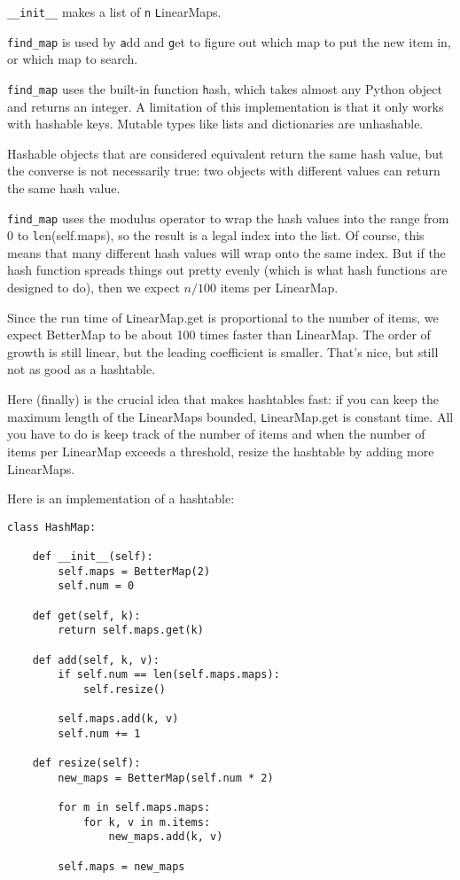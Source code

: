 \documentclass[
DIV=11,
fontsize=12,
twoside,
headinclude=false,
titlepage=firstiscover,
abstract=true,
headsepline=true,
footsepline=true,
chapterprefix=true, %
headings=big,
bibliography=totoc,%
captions=tableheading
]{scrbook}
\theoremstyle{definition}
\begin{document}
\verb"__init__" makes a list of {\texttt n} {\texttt LinearMap}s.

\verb"find_map" is used by
{\texttt add} and {\texttt get}
to figure out which map to put the
new item in, or which map to search.

\verb"find_map" uses the built-in function {\texttt hash}, which takes
almost any Python object and returns an integer.  A limitation of this
implementation is that it only works with hashable keys.  Mutable
types like lists and dictionaries are unhashable.

Hashable objects that are considered equivalent return the same hash
value, but the converse is not necessarily true: two objects with
different values can return the same hash value.

\verb"find_map" uses the modulus operator to wrap the hash values
into the range from 0 to {\texttt len(self.maps)}, so the result is a legal
index into the list.  Of course, this means that many different
hash values will wrap onto the same index.  But if the hash function
spreads things out pretty evenly (which is what hash functions
are designed to do), then we expect $n/100$ items per LinearMap.

Since the run time of {\texttt LinearMap.get} is proportional to the
number of items, we expect BetterMap to be about 100 times faster
than LinearMap.  The order of growth is still linear, but the
leading coefficient is smaller.  That's nice, but still not
as good as a hashtable.

Here (finally) is the crucial idea that makes hashtables fast: if you
can keep the maximum length of the LinearMaps bounded, {\texttt
  LinearMap.get} is constant time.  All you have to do is keep track
of the number of items and when the number of
items per LinearMap exceeds a threshold, resize the hashtable by
adding more LinearMaps.

Here is an implementation of a hashtable:

\begin{lstlisting}
class HashMap:

    def __init__(self):
        self.maps = BetterMap(2)
        self.num = 0

    def get(self, k):
        return self.maps.get(k)

    def add(self, k, v):
        if self.num == len(self.maps.maps):
            self.resize()

        self.maps.add(k, v)
        self.num += 1

    def resize(self):
        new_maps = BetterMap(self.num * 2)

        for m in self.maps.maps:
            for k, v in m.items:
                new_maps.add(k, v)

        self.maps = new_maps
\end{lstlisting}
\end{document}
